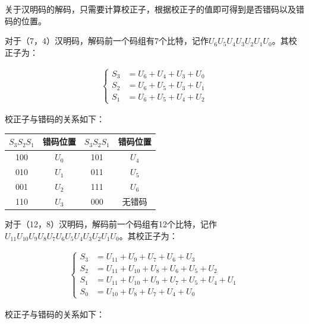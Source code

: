 \documentclass[UTF8]{ctexart}
\begin{document}
关于汉明码的解码，只需要计算校正子，根据校正子的值即可得到是否错码以及错码的位置。

对于（7，4）汉明码，解码前一个码组有7个比特，记作$U_6 U_5 U_4 U_3 U_2 U_1 U_0$。其校正子为：

\begin{align*}
    \left\{     
        \begin{aligned}
        S_3&=U_6+U_4+U_3+U_0  \\
        S_2&=U_6+U_5+U_3+U_1  \\
        S_1&=U_6+U_5+U_4+U_2 
        \end{aligned}
    \right.
\end{align*}

校正子与错码的关系如下：

\begin{table}[H]
    \centering
    \begin{tabular}{|c|c|c|c|}
    \hline
    $S_3S_2S_1$ & 错码位置  & $S_3S_2S_1$ & 错码位置  \\ \hline
    100         & $U_0$ & 101         & $U_4$ \\ \hline
    010         & $U_1$ & 011         & $U_5$ \\ \hline
    001         & $U_2$ & 111         & $U_6$ \\ \hline
    110         & $U_3$ & 000         & 无错码   \\ \hline
    \end{tabular}
\end{table}

对于（12，8）汉明码，解码前一个码组有12个比特，记作$U_{11} U_{10} U_9 U_8 U_7 U_6 U_5 U_4 U_3 U_2 U_1 U_0$。其校正子为：

\begin{align*}
    \left\{     
        \begin{aligned}
        S_3&=U_{11}+U_9+U_7+U_6+U_3  \\
        S_2&=U_{11}+U_{10}+U_8+U_6+U_5+U_2  \\
        S_1&=U_{11}+U_{10}+U_9+U_7 +U_5 +U_4+U_1  \\
        S_0&=U_{10}+U_8+U_7+U_4+U_0 
        \end{aligned}
    \right.
\end{align*}
   
校正子与错码的关系如下：
\end{document}
